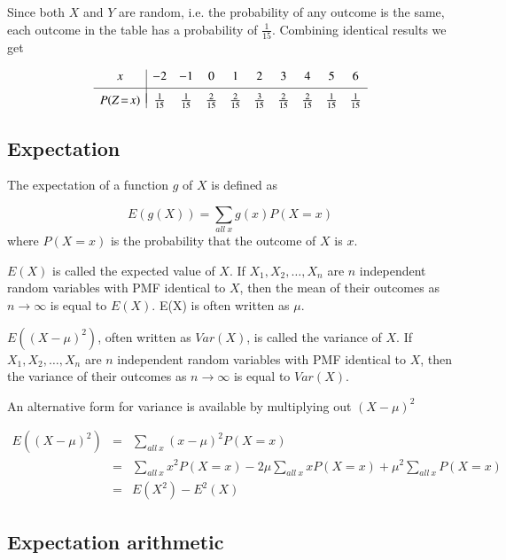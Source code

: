 \documentclass[a5paper]{article}
\begin{document}
Since both $X$ and $Y$ are random, i.e. the probability of any outcome is the
same, each outcome in the table has a probability of $\frac{1}{15}$. Combining
identical results we get

\begin{equation}
  \begin{array}{c|ccccccccc}
    x & -2 & -1 & 0 & 1 & 2 & 3 & 4 & 5 & 6\\[3pt]
    \hline \\[-8pt]
    P(Z\!=\!x) & \frac{1}{15} & \frac{1}{15} & \frac{2}{15} & \frac{2}{15} & \frac{3}{15}
    & \frac{2}{15} & \frac{2}{15} & \frac{1}{15} & \frac{1}{15}
  \end{array}
\end{equation}

\subsection{Expectation}

The expectation of a function $g$ of $X$ is defined as

\begin{equation} \label{eq:6}
  E(g(X)) = \sum_{all\ x} g(x)P(X\!=\!x)
\end{equation}
where $P(X\!=\!x)$ is the probability that the outcome of $X$ is $x$.

$E(X)$ is called the expected value of $X$. If $X_1, X_2, \ldots, X_n$ are $n$
independent random variables with PMF identical to $X$, then the mean of their
outcomes as $n\rightarrow\infty$ is equal to $E(X)$. E(X) is often written as
$\mu$.

$E((X-\mu)^2)$, often written as $Var(X)$, is called the variance of $X$. If
$X_1, X_2, \ldots, X_n$ are $n$ independent random variables with PMF identical
to $X$, then the variance of their outcomes as $n\rightarrow\infty$ is equal to
$Var(X)$.

An alternative form for variance is available by multiplying out $(X-\mu)^2$

\begin{eqnarray}
  E((X-\mu)^2) & = & \sum_{all\ x} (x-\mu)^2P(X\!=\!x) \nonumber\\
  & = &  \sum_{all\ x}x^2 P(X\!=\!x) - 2\mu\sum_{all\ x}x P(X\!=\!x) +
  \mu^2\sum_{all\ x}P(X\!=\!x) \nonumber\\
  & = & E(X^2) - E^2(X)
\end{eqnarray}

\subsection{Expectation arithmetic}
\end{document}
